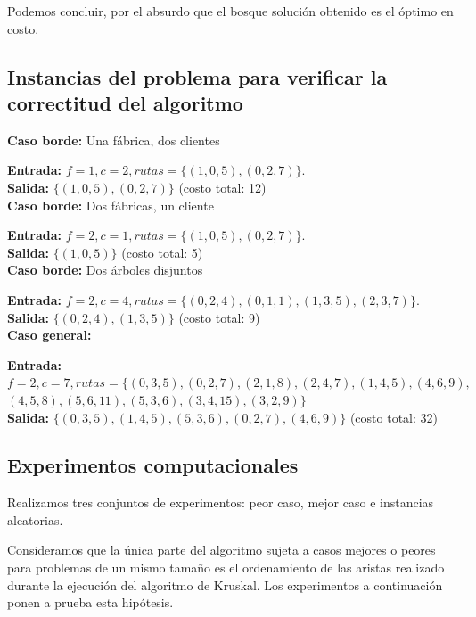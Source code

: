 \documentclass[a4paper, 10pt, twoside]{article}
\begin{document}
Podemos concluir, por el absurdo que el bosque solución obtenido es el óptimo en costo.


\subsection{Instancias del problema para verificar la correctitud del algoritmo}

\textbf{Caso borde:} Una fábrica, dos clientes

\textbf{Entrada:} $f = 1, c = 2, rutas = \{ (1, 0, 5), (0, 2, 7) \}$. \\
\textbf{Salida:}  $\{ (1, 0, 5), (0, 2, 7) \}$ (costo total: 12)
\\

\textbf{Caso borde:} Dos fábricas, un cliente

\textbf{Entrada:} $f = 2, c = 1, rutas = \{ (1, 0, 5), (0, 2, 7) \}$. \\
\textbf{Salida:}  $\{ (1, 0, 5) \}$ (costo total: 5)
\\

\textbf{Caso borde:} Dos árboles disjuntos

\textbf{Entrada:} $f = 2, c = 4, rutas = \{ (0, 2, 4), (0, 1, 1), (1, 3, 5), (2, 3, 7) \}$. \\
\textbf{Salida:}  $\{ (0, 2, 4), (1, 3, 5) \}$ (costo total: 9)
\\

\textbf{Caso general:}

\textbf{Entrada:} $f = 2, c = 7, rutas = \{ (0, 3, 5), (0, 2, 7), (2, 1, 8), (2, 4, 7), (1, 4, 5), (4, 6, 9), $ \\
$ (4, 5, 8), (5, 6, 11), (5, 3, 6), (3, 4, 15), (3, 2, 9) \}$ \\
\textbf{Salida:}  $\{ (0, 3, 5), (1, 4, 5), (5, 3, 6), (0, 2, 7), (4, 6, 9) \}$ (costo total: 32)


\subsection{Experimentos computacionales}

Realizamos tres conjuntos de experimentos: peor caso, mejor caso e instancias aleatorias.

Consideramos que la única parte del algoritmo sujeta a casos mejores o peores para problemas de un mismo tamaño es el ordenamiento de las aristas realizado durante la ejecución del algoritmo de Kruskal. Los experimentos a continuación ponen a prueba esta hipótesis.
\end{document}
